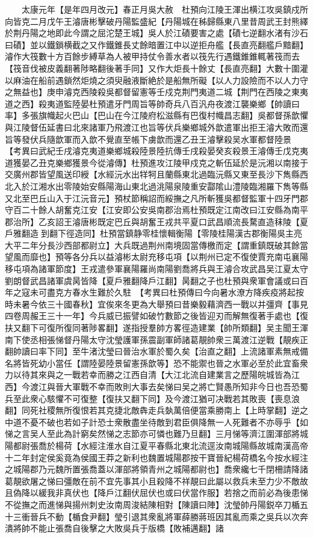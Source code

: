 　　太康元年【是年四月改元】春正月吳大赦　杜預向江陵王渾出横江攻吳鎮戍所向皆克二月戊午王濬唐彬擊破丹陽監盛紀【丹陽城在秭歸縣東八里昔周武王封熊繹於荆丹陽之地即此今謂之屈沱楚王城】吳人於江磧要害之處【磧七逆翻水渚有沙石曰磧】並以鐵鎖横截之又作鐵錐長丈餘暗置江中以逆拒舟艦【長直亮翻艦戶黯翻】濬作大筏數十方百餘步縛草為人被甲持仗令善水者以筏先行遇鐵錐錐輒著筏而去【筏音伐被皮義翻著陟略翻後著手同】又作大炬長十餘丈【長直亮翻】大數十圍灌以麻油在船前遇鎖然炬燒之須臾融液斷絶於是船無所礙【以人力設險而不以人力守之無益也】庚申濬克西陵殺吳都督留憲等壬戍克荆門夷道二城【荆門在西陵之東夷道之西】殺夷道監陸晏杜預遣牙門周旨等帥奇兵八百汎舟夜渡江襲樂鄉【帥讀曰率】多張旗幟起火巴山【巴山在今江陵府松滋縣有巴復村幟昌志翻】吳都督孫歆懼與江陵督伍延書曰北來諸軍乃飛渡江也旨等伏兵樂鄉城外歆遣軍出拒王濬大敗而還旨等發伏兵隨歆軍而入歆不覺直至帳下虜歆而還乙丑王濬擊殺吴水軍都督陸景　【考異曰武紀壬戌濬克夷道樂鄉城殺陸景陸抗傳壬戌殺晏癸亥殺景王濬傳壬戊克夷道獲晏乙丑克樂鄉獲景今從濬傳】杜預進攻江陵甲戍克之斬伍延於是沅湘以南接于交廣州郡皆望風送印綬【水經沅水出䍧牱且蘭縣東北過臨沅縣又東至長沙下雋縣西北入於江湘水出零陵始安縣陽海山東北過洮陽泉陵重安酃隂山澧陵臨湘羅下雋等縣又北至巴丘山入于江沅音元】預杖節稱詔而綏撫之凡所斬獲吳都督監軍十四牙門郡守百二十餘人胡奮克江安【江安即公安吳南郡治焉杜預既定江南改曰江安縣為南平郡治所】乙亥詔王濬唐彬既定巴丘與胡奮王戎共平夏口武昌順流長騖直造秣陵【夏戶雅翻造到翻下徑造同】杜預當鎮静零桂懷輯衡陽【零陵桂陽漢古郡衡陽吳主亮大平二年分長沙西部都尉立】大兵既過荆州南境固當傳檄而定【謂重鎮既破其餘當望風而靡也】預等各分兵以益濬彬太尉充移屯項【以荆州已定不復使賈充南屯襄陽移屯項為諸軍節度】王戎遣參軍襄陽羅尚南陽劉喬將兵與王濬合攻武昌吴江夏太守劉朗督武昌諸軍虞昺皆降【夏戶雅翻降戶江翻】昺翻之子也杜預與衆軍會議或曰百年之寇未可盡克方春水生難於久駐　【考異曰杜預傳曰今向暑水潦方降疾疫將起按時未暑今依三十國春秋】宜俟來冬更為大舉預曰昔樂毅藉濟西一戰以并彊齊【事見四卷周赧王三十一年】今兵威已振譬如破竹數節之後皆迎刃而解無復著手處也【復扶又翻下可復所復同著陟畧翻】遂指授羣帥方畧徑造建業【帥所類翻】吴主聞王渾南下使丞相張悌督丹陽太守沈瑩護軍孫震副軍師諸葛靚帥衆三萬渡江逆戰【靚疾正翻帥讀曰率下同】至牛渚沈瑩曰晉治水軍於蜀久矣【治直之翻】上流諸軍素無戒備名將皆死幼小當任【謂陸晏陸景留憲孫歆等】恐不能禦也晉之水軍必至於此宜畜衆力以待其來與之一戰若幸而勝之江西自清【大江北流自建業言之歷陽皖城皆為江西】今渡江與晉大軍戰不幸而敗則大事去矣悌曰吴之將亡賢愚所知非今日也吾恐蜀兵至此衆心駭懼不可復整【復扶又翻下同】及今渡江猶可决戰若其敗喪【喪息浪翻】同死社稷無所復恨若其克捷北敵犇走兵埶萬倍便當乘勝南上【上時掌翻】逆之中道不憂不破也若如子計恐士衆散盡坐待敵到君臣俱降無一人死難者不亦辱乎【如悌之言吴人至此為計窮矣然悌之志節亦可憐也難乃旦翻】三月悌等濟江圍渾部將城陽都尉張喬於楊荷【水經注淮水自江夏平春縣北東北流逕汝南城陽縣故城南漢高帝十二年封定侯奚竟為侯國王莽之新利也魏置城陽郡按干寶晉紀楊荷橋名今按水經注之城陽郡乃元魏所置張喬蓋以渾部將領青州之城陽都尉也】喬衆纔七千閉柵請降諸葛靚欲屠之悌曰彊敵在前不宜先事其小且殺降不祥靚曰此屬以救兵未至力少不敵故且偽降以緩我非真伏也【降戶江翻伏屈伏也或曰伏當作服】若捨之而前必為後患悌不從撫之而進悌與揚州刺史汝南周浚結陳相對【陳讀曰陣】沈瑩帥丹陽鋭卒刀楯五十三衝晉兵不動【楯食尹翻】瑩引退其衆亂將軍薛勝蔣班因其亂而乘之吳兵以次奔潰將帥不能止張喬自後擊之大敗吳兵于版橋【敗補邁翻】諸
